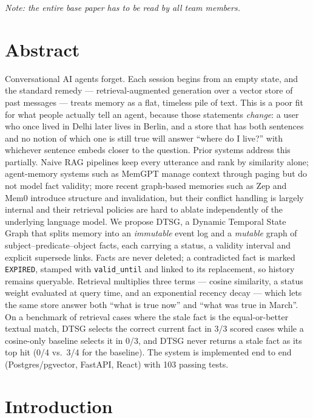 \documentclass[11pt,a4paper]{article}
\begin{document}
\noindent\footnotesize\textit{Note: the entire base paper has to be read by all
team members.}\normalsize

\section*{Abstract}
Conversational AI agents forget. Each session begins from an empty state, and
the standard remedy --- retrieval-augmented generation over a vector store of
past messages --- treats memory as a flat, timeless pile of text. This is a
poor fit for what people actually tell an agent, because those statements
\emph{change}: a user who once lived in Delhi later lives in Berlin, and a
store that has both sentences and no notion of which one is still true will
answer ``where do I live?'' with whichever sentence embeds closer to the
question. Prior systems address this partially. Naive RAG pipelines keep every
utterance and rank by similarity alone; agent-memory systems such as MemGPT
manage context through paging but do not model fact validity; more recent
graph-based memories such as Zep and Mem0 introduce structure and invalidation,
but their conflict handling is largely internal and their retrieval policies
are hard to ablate independently of the underlying language model. We propose
DTSG, a Dynamic Temporal State Graph that splits memory into an
\emph{immutable} event log and a \emph{mutable} graph of
subject--predicate--object facts, each carrying a status, a validity interval
and explicit supersede links. Facts are never deleted; a contradicted fact is
marked \texttt{EXPIRED}, stamped with \texttt{valid\_until} and linked to its
replacement, so history remains queryable. Retrieval multiplies three terms ---
cosine similarity, a status weight evaluated at query time, and an exponential
recency decay --- which lets the same store answer both ``what is true now''
and ``what was true in March''. On a benchmark of retrieval cases where the
stale fact is the equal-or-better textual match, DTSG selects the correct
current fact in 3/3 scored cases while a cosine-only baseline selects it in
0/3, and DTSG never returns a stale fact as its top hit (0/4 vs.\ 3/4 for the
baseline). The system is implemented end to end (Postgres/pgvector, FastAPI,
React) with 103 passing tests.

\clearpage

\section{Introduction}
\label{sec:intro}
\end{document}
